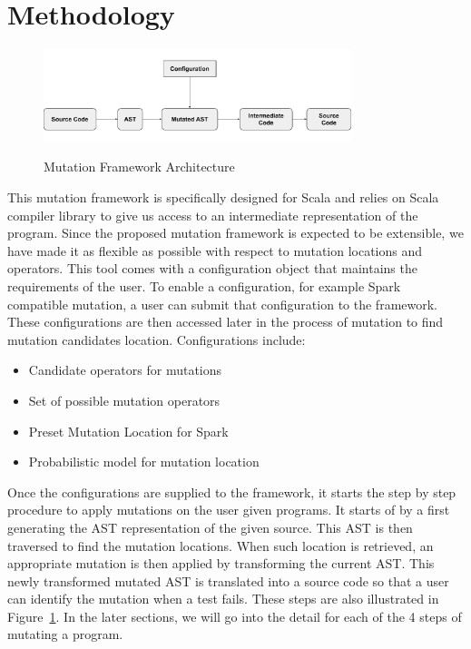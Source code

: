 \section{Methodology}

\begin{figure}[ht!]
\begin{center}
\includegraphics[width=0.8\textwidth]{image/flow}
\vspace{-1em}
   \caption{Mutation Framework Architecture}
   \vspace{-1.5em}
        \label{flow}
\end{center}
\end{figure}


This mutation framework is specifically designed for Scala and relies on Scala compiler library to give us access to an intermediate representation of the program. Since the proposed mutation framework is expected to be extensible, we have made it as flexible as possible with respect to mutation locations and operators. This tool comes with a configuration object that maintains the requirements of the user.  To enable a configuration, for example Spark compatible mutation, a user can submit that configuration to the framework. These configurations are then accessed later in the process of mutation to find mutation candidates location. Configurations include: 
\begin{itemize}
\item Candidate operators for mutations
\item Set of possible mutation operators
\item Preset Mutation Location for Spark
\item Probabilistic model for mutation location 
\end{itemize}

Once the configurations are supplied to the framework, it starts the step by step procedure to apply mutations on the user given programs. It starts of by a first generating the AST representation of the given source. This AST is then traversed to find the mutation locations. When such location is retrieved, an appropriate mutation is then applied by transforming the current AST. This newly transformed mutated AST is translated into a source code so that a user can identify the mutation when a test fails. These steps are also illustrated in Figure~\ref{flow}. In the later sections, we will go into the detail for each of the 4 steps of mutating a program.

